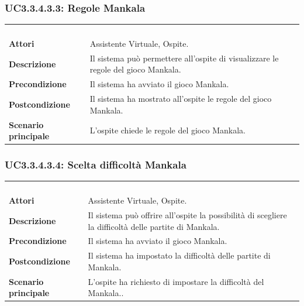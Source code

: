 \subsubsection{UC3.3.4.3.3: Regole Mankala}
\label{UC3.3.4.3.3}
\begin{longtable}{l|p{10cm}}
	\rowcolor[gray]{0.8} \multicolumn{2}{c}{} \\
	\rowcolor[gray]{0.8} \multicolumn{2}{c}{\textbf{UC3.3.4.3.3 - Regole Mankala}} \\
	\rowcolor[gray]{0.8} \multicolumn{2}{c}{} \\
	\hline
	&\\
	\textbf{Attori} & Assistente Virtuale, Ospite.\\[7pt]
	\textbf{Descrizione} & Il sistema può permettere all'ospite di visualizzare le regole del gioco Mankala.\\[7pt]
	\textbf{Precondizione} & Il sistema ha avviato il gioco Mankala.\\[7pt]
	\textbf{Postcondizione} & Il sistema ha mostrato all'ospite le regole del gioco Mankala.\\[7pt]
	\textbf{Scenario principale} &L'ospite chiede le regole del gioco Mankala.\\[7pt]\hline
\end{longtable}

\subsubsection{UC3.3.4.3.4: Scelta difficoltà Mankala}
\label{UC3.3.4.3.4}
\begin{longtable}{l|p{10cm}}
	\rowcolor[gray]{0.8} \multicolumn{2}{c}{} \\
	\rowcolor[gray]{0.8} \multicolumn{2}{c}{\textbf{UC3.3.4.3.4 - Scelta difficoltà Mankala}} \\
	\rowcolor[gray]{0.8} \multicolumn{2}{c}{} \\
	\hline
	&\\
	\textbf{Attori} & Assistente Virtuale, Ospite.\\[7pt]
	\textbf{Descrizione} & Il sistema può offrire all'ospite la possibilità di scegliere la difficoltà delle partite di Mankala.\\[7pt]
	\textbf{Precondizione} & Il sistema ha avviato il gioco Mankala.\\[7pt]
	\textbf{Postcondizione} & Il sistema ha impostato la difficoltà delle partite di Mankala.\\[7pt]
	\textbf{Scenario principale} &L'ospite ha richiesto di impostare la difficoltà del Mankala..\\[7pt]\hline
\end{longtable}

